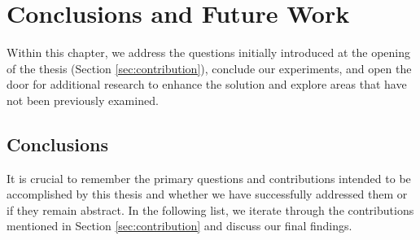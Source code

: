 \chapter{Conclusions and Future Work}\label{chap:conclusion}

Within this chapter, we address the questions initially introduced at the opening of the thesis (Section \ref{sec:contribution}), conclude our experiments, and open the door for additional research to enhance the solution and explore areas that have not been previously examined.
\section{Conclusions}

It is crucial to remember the primary questions and contributions intended to be accomplished by this thesis and whether we have successfully addressed them or if they remain abstract. In the following list, we iterate through the contributions mentioned in Section \ref{sec:contribution}  and discuss our final findings.

